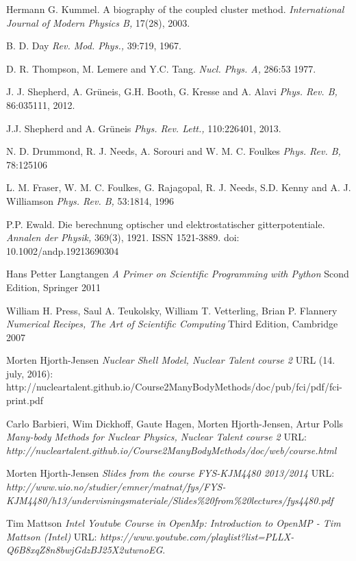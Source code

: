 \documentclass[twoside,english]{uiofysmaster}
\begin{document}
\begin{thebibliography}{9}
	Hermann G. Kummel. A biography of the coupled cluster method. 
	\textit{International Journal of Modern Physics B,} 17(28), 2003. 

	B. D. Day
	\textit{Rev. Mod. Phys.,}
	39:719, 1967.

	D. R. Thompson, M. Lemere and Y.C. Tang.
	\textit{Nucl. Phys. A,} 286:53 1977.

	J. J. Shepherd, A. Grüneis, G.H. Booth, G. Kresse and A. Alavi 
	\textit{Phys. Rev. B,} 86:035111, 2012.

	J.J. Shepherd and A. Grüneis
	\textit{Phys. Rev. Lett.,} 110:226401, 2013.

	N. D. Drummond, R. J. Needs, A. Sorouri and W. M. C. Foulkes
	\textit{Phys. Rev. B,} 78:125106

	L. M. Fraser, W. M. C. Foulkes, G. Rajagopal, R. J. Needs, S.D. Kenny and A. J. Williamson
	\textit{Phys. Rev. B,} 53:1814, 1996

	P.P. Ewald. Die berechnung optischer und elektrostatischer gitterpotentiale. 
	\textit{Annalen der Physik,} 369(3), 1921. ISSN 1521-3889. doi: 10.1002/andp.19213690304

	Hans Petter Langtangen
	\textit{A Primer on Scientific Programming with Python} Scond Edition, Springer 2011

	William H. Press, Saul A. Teukolsky, William T. Vetterling, Brian P. Flannery
	\textit{Numerical Recipes, The Art of Scientific Computing} Third Edition, Cambridge 2007

	Morten Hjorth-Jensen
	\textit{Nuclear Shell Model, Nuclear Talent course 2} 
	URL (14. july, 2016): http://nucleartalent.github.io/Course2ManyBodyMethods/doc/pub/fci/pdf/fci-print.pdf

	Carlo Barbieri, Wim Dickhoff, Gaute Hagen, Morten Hjorth-Jensen, Artur Polls
	\textit{Many-body Methods for Nuclear Physics, Nuclear Talent course 2} 
	URL: \textit{http://nucleartalent.github.io/Course2ManyBodyMethods/doc/web/course.html}

	Morten Hjorth-Jensen
	\textit{Slides from the course FYS-KJM4480 2013/2014}
	URL: \textit{http://www.uio.no/studier/emner/matnat/fys/FYS-KJM4480/h13/undervisningsmateriale/Slides\%20from\%20lectures/fys4480.pdf}

	Tim Mattson
	\textit{Intel Youtube Course in OpenMp: Introduction to OpenMP - Tim Mattson (Intel)}
	URL: \textit{https://www.youtube.com/playlist?list=PLLX-Q6B8xqZ8n8bwjGdzBJ25X2utwnoEG}.


\end{thebibliography}
\end{document}

